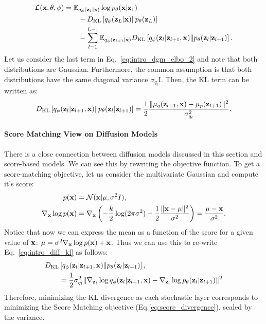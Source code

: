 \begin{align}
    \mathcal{L}(\rvx, \theta, \phi) & =\E_{q_{\phi}(\rvz_{1}|\rvx)}\log p_{\theta}(\rvx|\rvz_{1}) \label{eq:intro_dgm_elbo_1}\\
    &\quad\quad-\KL{ q_{\phi}(\rvz_L|\rvx)}{p_{\theta}(\rvz_L)}\label{eq:intro_dgm_elbo_2}\\
    &\quad\quad- \sum_{l=1}^{L-1} \E_{q_{\phi}(\rvz_{l+1}|\rvx)} \KL{q_{\phi}(\rvz_l|\rvz_{l+1}, \rvx)}{p_{\theta}(\rvz_l|\rvz_{l+1})}. \label{eq:intro_dgm_elbo_3}
\end{align}
Let us consider the last term in Eq.~\ref{eq:intro_dgm_elbo_2} and note that both distributions are Gaussian. Furthermore, the common assumption is that both distributions have the same diagonal variance $\sigma_{q_l}$I. Then, the KL term can be written as:
\begin{equation}\label{eq:intro_diff_kl}
    \KL{q_{\phi}(\rvz_l|\rvz_{l+1}, \rvx)}{p_{\theta}(\rvz_l|\rvz_{l+1})} = \frac 12 \frac{\|\mu_q(\rvz_{l+1}, \rvx) - \mu_p(\rvz_{l+1})\|^2}{\sigma_{q_l}^2}.
\end{equation}

\paragraph{Score Matching View on Diffusion Models}
There is a close connection between diffusion models discussed in this section and score-based models.  We can see this by rewriting the objective function. 
To get a score-matching objective, let us consider the multivariate Gaussian and compute it's score:
\begin{align}
    p({\mathbf{x}}) &= \mathcal{N}({\mathbf{x}}|\mu, \sigma^2I),\\
    \nabla_{{\mathbf{x}}}\log p({\mathbf{x}}) &= \nabla_{{\mathbf{x}}}\left(-\frac k2 \log(2\pi\sigma^2) - \frac12 \frac{\|{\mathbf{x}} - \mu\|^2}{\sigma^2}\right) = \frac{\mu - {\mathbf{x}}}{\sigma^2}. 
\end{align}
Notice that now we can express the mean as a function of the score for a given value of ${\mathbf{x}}$: $ \mu  = \sigma^2 \nabla_{{\mathbf{x}}}\log p({\mathbf{x}}) + {\mathbf{x}}$. Thus we can use this to re-write Eq.~\ref{eq:intro_diff_kl} as follows:
\begin{align}
    &D_{\mathrm{KL}}\left[q_{\phi}({\mathbf{z}}_l|{\mathbf{z}}_{l+1}, {\mathbf{x}})\|p_{\theta}({\mathbf{z}}_l|{\mathbf{z}}_{l+1})\right], \\
    &\quad\quad= \frac 12 \sigma_{q_l}^2 \|\nabla_{{\mathbf{z}}_l}\log q_{\phi}({\mathbf{z}}_l|{\mathbf{z}}_{l+1}, {\mathbf{x}})  - \nabla_{{\mathbf{z}}_l}\log p_{\theta}({\mathbf{z}}_l|{\mathbf{z}}_{l+1})\|^2
\end{align}
Therefore, minimizing the KL divergence as each stochastic layer corresponds to minimizing the Score Matching objective (Eq.\ref{eq:score_divergence}), scaled by the variance. 

